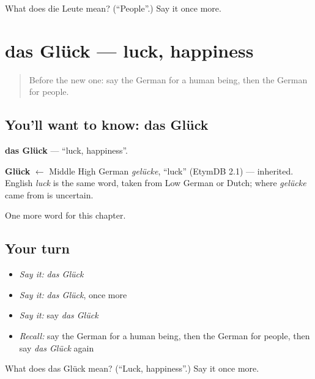 \begin{tcolorbox}[breakable,colback=teal!4,colframe=teal!35!black,title={Before you move on}]
What does die Leute mean? (\textquotedblleft{}People\textquotedblright{}.) Say it once more.
\end{tcolorbox}
\section[das Glück]{das Glück — luck, happiness}

\label{lesson:GE-C165-glueck}



\begin{quote}
Before the new one: say the German for a human being, then the German for people.
\end{quote}

\subsection*{You'll want to know: das Glück}
\textbf{das Glück} — \textquotedblleft{}luck, happiness\textquotedblright{}.

\begin{cousinweb}
\textbf{Glück} $\leftarrow$ Middle High German \emph{gelücke}, \textquotedblleft{}luck\textquotedblright{} (EtymDB 2.1) — inherited. English \emph{luck} is the same word, taken from Low German or Dutch; where \emph{gelücke} came from is uncertain.
\end{cousinweb}

\begin{grammarlens}[title={What you've built}]
One more word for this chapter.
\end{grammarlens}

\subsection*{Your turn}
\begin{itemize}
\raggedright
  \item \emph{Say it:} \emph{das Glück}
  \item \emph{Say it:} \emph{das Glück}, once more
  \item \emph{Say it:} say \emph{das Glück}
  \item \emph{Recall:} say the German for a human being, then the German for people, then say \emph{das Glück} again
\end{itemize}

\begin{tcolorbox}[breakable,colback=teal!4,colframe=teal!35!black,title={Before you move on}]
What does das Glück mean? (\textquotedblleft{}Luck, happiness\textquotedblright{}.) Say it once more.
\end{tcolorbox}
